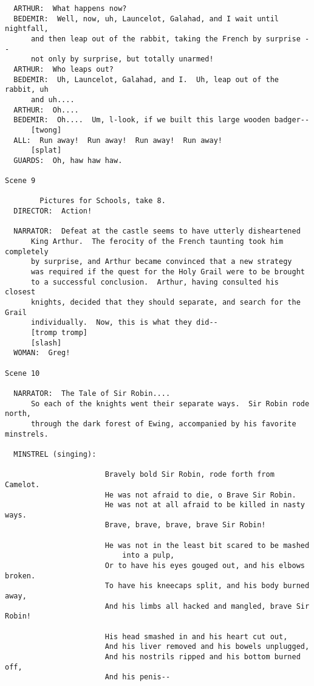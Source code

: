 \documentclass{article}
\begin{document}
\begin{verbatim}
  ARTHUR:  What happens now?
  BEDEMIR:  Well, now, uh, Launcelot, Galahad, and I wait until nightfall,
      and then leap out of the rabbit, taking the French by surprise --
      not only by surprise, but totally unarmed!
  ARTHUR:  Who leaps out?
  BEDEMIR:  Uh, Launcelot, Galahad, and I.  Uh, leap out of the rabbit, uh
      and uh....
  ARTHUR:  Oh....
  BEDEMIR:  Oh....  Um, l-look, if we built this large wooden badger--
      [twong]
  ALL:  Run away!  Run away!  Run away!  Run away!
      [splat]
  GUARDS:  Oh, haw haw haw.

Scene 9

        Pictures for Schools, take 8.
  DIRECTOR:  Action!

  NARRATOR:  Defeat at the castle seems to have utterly disheartened
      King Arthur.  The ferocity of the French taunting took him completely
      by surprise, and Arthur became convinced that a new strategy
      was required if the quest for the Holy Grail were to be brought
      to a successful conclusion.  Arthur, having consulted his closest
      knights, decided that they should separate, and search for the Grail
      individually.  Now, this is what they did--
      [tromp tromp]
      [slash]
  WOMAN:  Greg!

Scene 10

  NARRATOR:  The Tale of Sir Robin....
      So each of the knights went their separate ways.  Sir Robin rode north,
      through the dark forest of Ewing, accompanied by his favorite minstrels.

  MINSTREL (singing):

                       Bravely bold Sir Robin, rode forth from Camelot.
                       He was not afraid to die, o Brave Sir Robin.
                       He was not at all afraid to be killed in nasty ways.
                       Brave, brave, brave, brave Sir Robin!

                       He was not in the least bit scared to be mashed
                           into a pulp,
                       Or to have his eyes gouged out, and his elbows broken.
                       To have his kneecaps split, and his body burned away,
                       And his limbs all hacked and mangled, brave Sir Robin!

                       His head smashed in and his heart cut out,
                       And his liver removed and his bowels unplugged,
                       And his nostrils ripped and his bottom burned off,
                       And his penis--


\end{verbatim}
\end{document}
